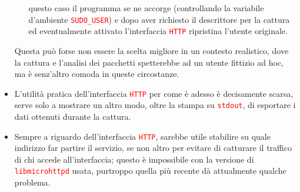 \documentclass[a4paper,11pt]{article}
\newcommand\code[1]{\textcolor{red}{\texttt{#1}}}
\begin{document}
\begin{itemize}
\begin{enumerate}
    questo caso il programma se ne accorge (controllando la variabile
    d'ambiente \code{SUDO\_USER}) e dopo aver richiesto il descrittore
    per la cattura ed eventualmente attivato l'interfaccia \code{HTTP}
    ripristina l'utente originale.
  \end{enumerate}
  Questa può forse non essere la scelta migliore in un contesto
  realistico, dove la cattura e l'analisi dei pacchetti spetterebbe ad
  un utente fittizio ad hoc, ma è senz'altro comoda in queste
  circostanze.
\item L'utilità pratica dell'interfaccia \code{HTTP} per come è adesso
  è decisamente scarsa, serve solo a mostrare un altro modo, oltre la
  stampa su \code{stdout}, di esportare i dati ottenuti durante la
  cattura.
\item Sempre a riguardo dell'interfaccia \code{HTTP}, sarebbe utile
  stabilire su quale indirizzo far partire il servizio, se non altro
  per evitare di catturare il traffico di chi accede all'interfaccia;
  questo è impossibile con la versione di \code{libmicrohttpd} usata,
  purtroppo quella più recente dà attualmente qualche problema.
\end{itemize}
\end{document}
